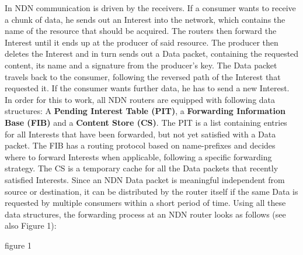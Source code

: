In NDN communication is driven by the receivers. If a consumer wants to receive a chunk of data, he sends out an Interest into the network, which contains the name of the resource that should be acquired. The routers then forward the Interest until it ends up at the producer of said resource. The producer then deletes the Interest and in turn sends out a Data packet, containing the requested content, its name and a signature from the producer's key. The Data packet travels back to the consumer, following the reversed path of the Interest that requested it. If the consumer wants further data, he has to send a new Interest. In order for this to work, all NDN routers are equipped with following data structures: A \textbf{Pending Interest Table (PIT)}, a \textbf{Forwarding Information Base (FIB)} and a \textbf{Content Store (CS)}. The PIT is a list containing entries for all Interests that have been forwarded, but not yet satisfied with a Data packet. The FIB has a routing protocol based on name-prefixes and decides where to forward Interests when applicable, following a specific forwarding strategy. The CS is a temporary cache for all the Data packets that recently satisfied Interests. Since an NDN Data packet is meaningful independent from source or destination, it can be distributed by the router itself if the same Data is requested by multiple consumers within a short period of time. Using all these data structures, the forwarding process at an NDN router looks as follows (see also Figure 1):

figure 1 \cite{ZABJ14} \\

